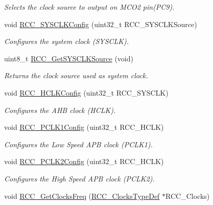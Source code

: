 \begin{DoxyCompactItemize}
\begin{DoxyCompactList}\small\item\em Selects the clock source to output on M\+C\+O2 pin(\+P\+C9). \end{DoxyCompactList}\item 
void \mbox{\hyperlink{group___r_c_c_ga3551a36a8f0a3dc96a74d6b939048337}{R\+C\+C\+\_\+\+S\+Y\+S\+C\+L\+K\+Config}} (uint32\+\_\+t R\+C\+C\+\_\+\+S\+Y\+S\+C\+L\+K\+Source)
\begin{DoxyCompactList}\small\item\em Configures the system clock (S\+Y\+S\+C\+LK). \end{DoxyCompactList}\item 
uint8\+\_\+t \mbox{\hyperlink{group___r_c_c_gaaeb32311c208b2a980841c9c884a41ea}{R\+C\+C\+\_\+\+Get\+S\+Y\+S\+C\+L\+K\+Source}} (void)
\begin{DoxyCompactList}\small\item\em Returns the clock source used as system clock. \end{DoxyCompactList}\item 
void \mbox{\hyperlink{group___r_c_c_ga9d0aec72e236c6cdf3a3a82dfb525491}{R\+C\+C\+\_\+\+H\+C\+L\+K\+Config}} (uint32\+\_\+t R\+C\+C\+\_\+\+S\+Y\+S\+C\+LK)
\begin{DoxyCompactList}\small\item\em Configures the A\+HB clock (H\+C\+LK). \end{DoxyCompactList}\item 
void \mbox{\hyperlink{group___r_c_c_ga448137346d4292985d4e7a61dd1a824f}{R\+C\+C\+\_\+\+P\+C\+L\+K1\+Config}} (uint32\+\_\+t R\+C\+C\+\_\+\+H\+C\+LK)
\begin{DoxyCompactList}\small\item\em Configures the Low Speed A\+PB clock (P\+C\+L\+K1). \end{DoxyCompactList}\item 
void \mbox{\hyperlink{group___r_c_c_ga09f9c010a4adca9e036da42c2ca6126a}{R\+C\+C\+\_\+\+P\+C\+L\+K2\+Config}} (uint32\+\_\+t R\+C\+C\+\_\+\+H\+C\+LK)
\begin{DoxyCompactList}\small\item\em Configures the High Speed A\+PB clock (P\+C\+L\+K2). \end{DoxyCompactList}\item 
void \mbox{\hyperlink{group___r_c_c_ga3e9944fd1ed734275222bbb3e3f29993}{R\+C\+C\+\_\+\+Get\+Clocks\+Freq}} (\mbox{\hyperlink{struct_r_c_c___clocks_type_def}{R\+C\+C\+\_\+\+Clocks\+Type\+Def}} $\ast$R\+C\+C\+\_\+\+Clocks)

\end{DoxyCompactItemize}
